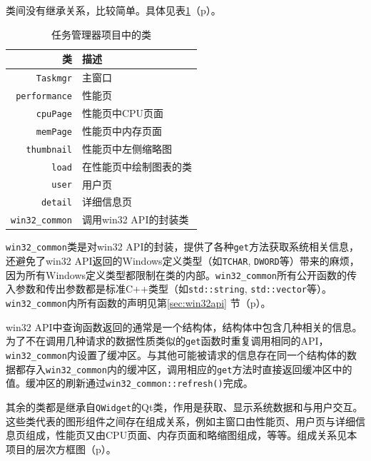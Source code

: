 \documentclass[UTF8,twoside,titlepage]{ctexart}
\newcommand\code[1]{\texttt{#1}}
\newcommand\myref[1]{\ref{#1}（p\pageref{#1}）}
\begin{document}
类间没有继承关系，比较简单。具体见表\myref{table:classes}。
\begin{table}[htb]
    \centering
    \begin{tabular}{rl}
        \hline
        类 & 描述 \\
        \hline
        \code{Taskmgr} & 主窗口 \\
        \code{performance} & 性能页 \\
        \code{cpuPage} & 性能页中CPU页面 \\
        \code{memPage} & 性能页中内存页面 \\
        \code{thumbnail} & 性能页中左侧缩略图 \\
        \code{load} & 在性能页中绘制图表的类 \\
        \code{user} & 用户页 \\
        \code{detail} & 详细信息页 \\
        \code{win32\_common} & 调用win32 API的封装类 \\
        \hline
    \end{tabular}
    \caption{任务管理器项目中的类}
    \label{table:classes}
\end{table}

\code{win32\_common}类是对win32 API的封装，提供了各种\code{get}方法获取系统相关信息，还避免了win32 API返回的Windows定义类型（如\code{TCHAR}, \code{DWORD}等）带来的麻烦，因为所有Windows定义类型都限制在类的内部。\code{win32\_common}所有公开函数的传入参数和传出参数都是标准C++类型（如\code{std::string}, \code{std::vector}等）。\code{win32\_common}内所有函数的声明见第\ref{sec:win32api} 节（p\pageref{sec:win32api}）。

win32 API中查询函数返回的通常是一个结构体，结构体中包含几种相关的信息。为了不在调用几种请求的数据性质类似的\code{get}函数时重复调用相同的API，\code{win32\_common}内设置了缓冲区。与其他可能被请求的信息存在同一个结构体的数据都存入\code{win32\_common}内的缓冲区，调用相应的\code{get}方法时直接返回缓冲区中的值。缓冲区的刷新通过\code{win32\_common::refresh()}完成。

其余的类都是继承自\code{QWidget}的Qt类，作用是获取、显示系统数据和与用户交互。这些类代表的图形组件之间存在组成关系，例如主窗口由性能页、用户页与详细信息页组成，性能页又由CPU页面、内存页面和略缩图组成，等等。组成关系见本项目的层次方框图（p\pageref{fig:ccfk}）。
\end{document}
